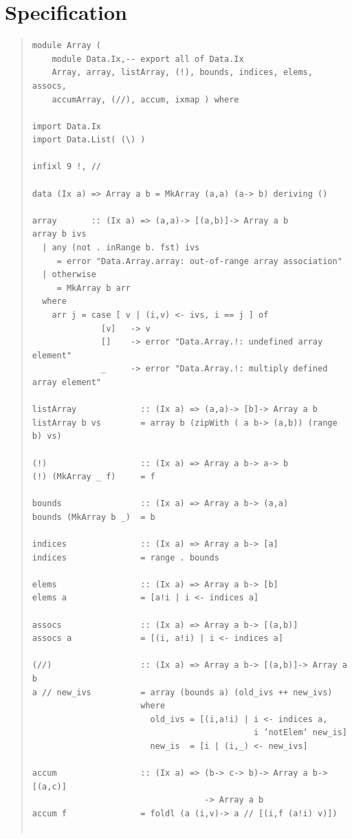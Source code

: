 \section{Specification}
\begin{quote}
{\haddockverb\begin{verbatim}
module Array (
    module Data.Ix,-- export all of Data.Ix
    Array, array, listArray, (!), bounds, indices, elems, assocs,
    accumArray, (//), accum, ixmap ) where

import Data.Ix
import Data.List( (\) )

infixl 9 !, //

data (Ix a) => Array a b = MkArray (a,a) (a-> b) deriving ()

array       :: (Ix a) => (a,a)-> [(a,b)]-> Array a b
array b ivs
  | any (not . inRange b. fst) ivs
     = error "Data.Array.array: out-of-range array association"
  | otherwise
     = MkArray b arr
  where
    arr j = case [ v | (i,v) <- ivs, i == j ] of
              [v]   -> v
              []    -> error "Data.Array.!: undefined array element"
              _     -> error "Data.Array.!: multiply defined array element"

listArray             :: (Ix a) => (a,a)-> [b]-> Array a b
listArray b vs        = array b (zipWith ( a b-> (a,b)) (range b) vs)

(!)                   :: (Ix a) => Array a b-> a-> b
(!) (MkArray _ f)     = f

bounds                :: (Ix a) => Array a b-> (a,a)
bounds (MkArray b _)  = b

indices               :: (Ix a) => Array a b-> [a]
indices               = range . bounds

elems                 :: (Ix a) => Array a b-> [b]
elems a               = [a!i | i <- indices a]

assocs                :: (Ix a) => Array a b-> [(a,b)]
assocs a              = [(i, a!i) | i <- indices a]

(//)                  :: (Ix a) => Array a b-> [(a,b)]-> Array a b
a // new_ivs          = array (bounds a) (old_ivs ++ new_ivs)
                      where
                        old_ivs = [(i,a!i) | i <- indices a,
                                             i ‘notElem‘ new_is]
                        new_is  = [i | (i,_) <- new_ivs]

accum                 :: (Ix a) => (b-> c-> b)-> Array a b-> [(a,c)]
                                   -> Array a b
accum f               = foldl (a (i,v)-> a // [(i,f (a!i) v)])


\end{verbatim}}
\end{quote}
